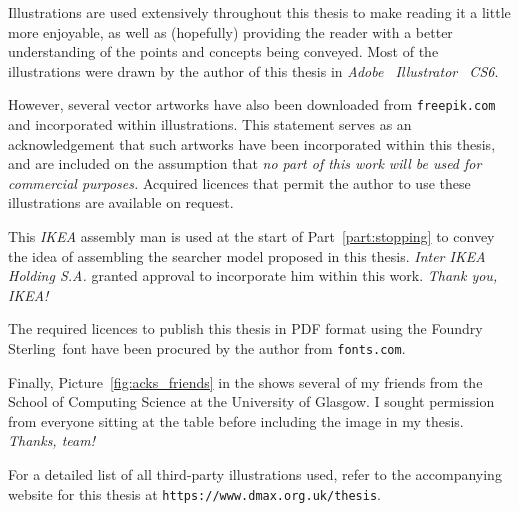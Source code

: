 
\begin{preamble}

Illustrations are used extensively throughout this thesis to make reading it a little more enjoyable, as well as (hopefully) providing the reader with a better understanding of the points and concepts being conveyed. Most of the illustrations were drawn by the author of this thesis in \emph{Adobe \textregistered~Illustrator \textregistered~CS6}.

However, several vector artworks have also been downloaded from \texttt{freepik.com} and incorporated within illustrations. This statement serves as an acknowledgement that such artworks have been incorporated within this thesis, and are included on the assumption that \textit{no part of this work will be used for commercial purposes.} Acquired licences that permit the author to use these illustrations are available on request.

This \textit{IKEA} assembly man is used at the start of Part~\ref{part:stopping} to convey the idea of assembling the searcher model proposed in this thesis. \emph{Inter IKEA Holding S.A.} granted approval to incorporate him within this work. \emph{Thank you, IKEA!}

The required licences to publish this thesis in PDF format using the \headerfont\selectfont Foundry Sterling\normalfont\selectfont~font have been procured by the author from \texttt{fonts.com}.

Finally, Picture~\ref{fig:acks_friends} in the  shows several of my friends from the School of Computing Science at the University of Glasgow. I sought permission from everyone sitting at the table before including the image in my thesis. \emph{Thanks, team!}

For a detailed list of all third-party illustrations used, refer to the accompanying website for this thesis at \texttt{https://www.dmax.org.uk/thesis}.

\end{preamble}

\newpage